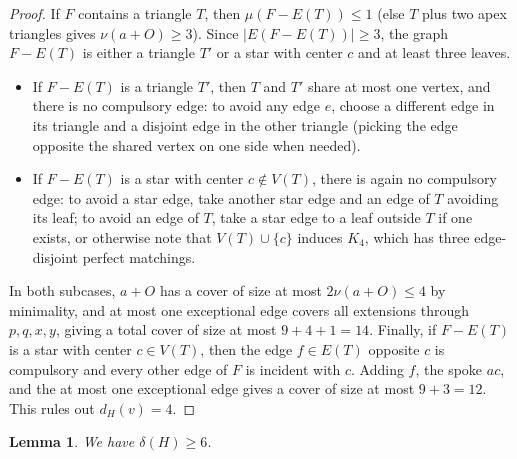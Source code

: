 \documentclass[11pt]{article}
\newtheorem{lemma}[theorem]{Lemma}
\begin{document}
\begin{proof}
If $F$ contains a triangle $T$, then $\mu(F-E(T))\leq 1$ (else $T$ plus two apex triangles gives $\nu(a+O)\geq 3$). Since $|E(F-E(T))|\geq 3$, the graph $F-E(T)$ is either a triangle $T'$ or a star with center $c$ and at least three leaves.
\begin{itemize}
\item If $F-E(T)$ is a triangle $T'$, then $T$ and $T'$ share at most one vertex, and there is no compulsory edge: to avoid any edge $e$, choose a different edge in its triangle and a disjoint edge in the other triangle (picking the edge opposite the shared vertex on one side when needed).
\item If $F-E(T)$ is a star with center $c\notin V(T)$, there is again no compulsory edge: to avoid a star edge, take another star edge and an edge of $T$ avoiding its leaf; to avoid an edge of $T$, take a star edge to a leaf outside $T$ if one exists, or otherwise note that $V(T)\cup\{c\}$ induces $K_4$, which has three edge-disjoint perfect matchings.
\end{itemize}
In both subcases, $a+O$ has a cover of size at most $2\nu(a+O)\leq 4$ by minimality, and at most one exceptional edge covers all extensions through $p,q,x,y$, giving a total cover of size at most $9+4+1=14$. Finally, if $F-E(T)$ is a star with center $c\in V(T)$, then the edge $f\in E(T)$ opposite $c$ is compulsory and every other edge of $F$ is incident with $c$. Adding $f$, the spoke $ac$, and the at most one exceptional edge gives a cover of size at most $9+3=12$. This rules out $d_H(v)=4$.
\end{proof}

\begin{lemma}\label{lem:d11-deg5}
We have $\delta(H)\geq 6$.
\end{lemma}
\end{document}
